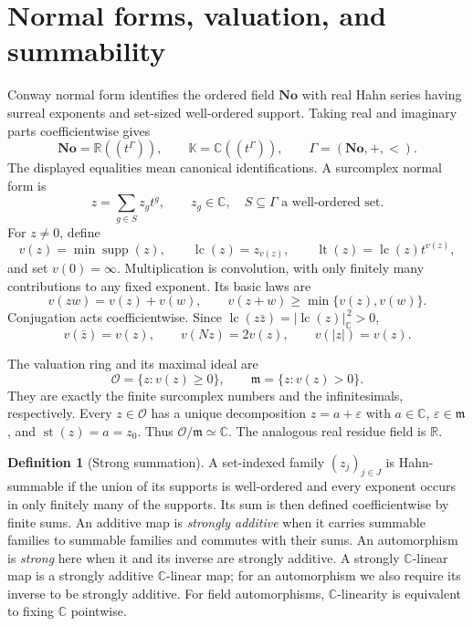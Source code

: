 \documentclass[11pt]{article}
\theoremstyle{definition}
\newtheorem{definition}[theorem]{Definition}
\theoremstyle{remark}
\newcommand{\No}{\mathbf{No}}
\newcommand{\R}{\mathbb R}
\newcommand{\C}{\mathbb C}
\newcommand{\K}{\mathbb K}
\newcommand{\OO}{\mathcal O}
\newcommand{\mm}{\mathfrak m}
\newcommand{\supp}{\operatorname{supp}}
\newcommand{\lc}{\operatorname{lc}}
\newcommand{\st}{\operatorname{st}}
\numberwithin{equation}{section}
\begin{document}
\section{Normal forms, valuation, and summability}\label{saut:sec:hahn}

Conway normal form identifies the ordered field $\No$ with real Hahn series
having surreal exponents and set-sized well-ordered support. Taking real and
imaginary parts coefficientwise gives
\begin{equation}\label{saut:eq:hahn}
 \No=\R((t^\Gamma)),\qquad
 \K=\C((t^\Gamma)),\qquad \Gamma=(\No,+,<).
\end{equation}
The displayed equalities mean canonical identifications. A surcomplex normal
form is
\[
 z=\sum_{g\in S}z_g t^g,
 \qquad z_g\in\C,\quad S\subseteq\Gamma\text{ a well-ordered set}.
\]
For $z\ne0$, define
\[
 v(z)=\min\supp(z),\qquad \lc(z)=z_{v(z)},\qquad
 \operatorname{lt}(z)=\lc(z)t^{v(z)},
\]
and set $v(0)=\infty$. Multiplication is convolution, with only finitely many
contributions to any fixed exponent. Its basic laws are
\[
 v(zw)=v(z)+v(w),\qquad
 v(z+w)\ge\min\{v(z),v(w)\}.
\]
Conjugation acts coefficientwise. Since
$\lc(z\bar z)=|\lc(z)|_{\C}^{\,2}>0$,
\begin{equation}\label{saut:eq:normvalue}
 v(\bar z)=v(z),\qquad v(Nz)=2v(z),\qquad v(|z|)=v(z).
\end{equation}

The valuation ring and its maximal ideal are
\[
 \OO=\{z:v(z)\ge0\},\qquad \mm=\{z:v(z)>0\}.
\]
They are exactly the finite surcomplex numbers and the infinitesimals,
respectively. Every $z\in\OO$ has a unique decomposition $z=a+\varepsilon$
with $a\in\C$, $\varepsilon\in\mm$, and $\st(z)=a=z_0$. Thus
$\OO/\mm\simeq\C$. The analogous real residue field is $\R$.

\begin{definition}[Strong summation]
A set-indexed family $(z_j)_{j\in J}$ is Hahn-summable if the union of its
supports is well-ordered and every exponent occurs in only finitely many
of the supports. Its sum is then defined coefficientwise by finite sums.
An additive map is \emph{strongly additive} when it carries summable
families to summable families and commutes with their sums. An automorphism
is \emph{strong} here when it and its inverse are strongly additive.
A strongly $\C$-linear map is a strongly additive $\C$-linear map;
for an automorphism we also require its inverse to be strongly additive.
For field automorphisms, $\C$-linearity is equivalent to fixing $\C$ pointwise.
\end{definition}
\end{document}
